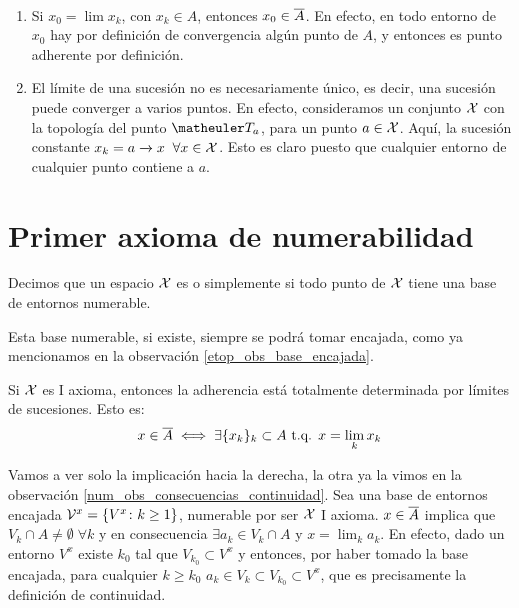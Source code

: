 \begin{obs} \
	\label{num_obs_consecuencias_continuidad}
	\begin{enumerate}
		\item Si $x_0 = \lim x_k$, con $x_k\in A$, entonces $x_0\in\overline{A}$. En efecto, en todo entorno de $x_0$ hay por definición de convergencia algún punto de $A$, y entonces es punto adherente por definición.
		
		\item El límite de una sucesión no es necesariamente único, es decir, una sucesión puede converger a varios puntos. En efecto, consideramos un conjunto $\mathcal{X}$ con la topología del punto $\T_a$, para un punto $a\in\mathcal{X}$. Aquí, la sucesión constante $x_k=a\xrightarrow[]{} x\;\;\forall x\in\mathcal{X}$. Esto es claro puesto que cualquier entorno de cualquier punto contiene a $a$.
		
	\end{enumerate}
\end{obs}

\section{Primer axioma de numerabilidad}

\begin{defi}
	Decimos que un espacio $\mathcal{X}$ es  o simplemente  si todo punto de $\mathcal{X}$ tiene una base de entornos numerable.
\end{defi}

\begin{obs}
	Esta base numerable, si existe, siempre se podrá tomar encajada, como ya mencionamos en la observación \ref{etop_obs_base_encajada}. 
\end{obs}

\begin{obs}
	\label{num_obs_adherencia_limites}	
	Si $\mathcal{X}$ es I axioma, entonces la adherencia está totalmente determinada por límites de sucesiones. Esto es:
	\[x\in \overline{A}\iff \exists\{x_k\}_k\subset A\text{ t.q. } x=\lim_k x_k \]
	
	Vamos a ver solo la implicación hacia la derecha, la otra ya la vimos en la observación \ref{num_obs_consecuencias_continuidad}. Sea una base de entornos encajada $\mathcal{V}^x=\{V^x\colon k\geq 1\}$, numerable por ser $\mathcal{X}$ I axioma. $x\in\overline{A}$ implica que $V_k\cap A\neq\emptyset\;\forall k$ y en consecuencia $\exists a_k\in V_k\cap A$ y $x=\lim_k a_k$. En efecto, dado un entorno $V^x$ existe $k_0$ tal que $V_{k_0}\subset V^x$ y entonces, por haber tomado la base encajada, para cualquier $k\geq k_0$ $a_k\in V_k\subset V_{k_0}\subset V^x$, que es precisamente la definición de continuidad.
\end{obs}

